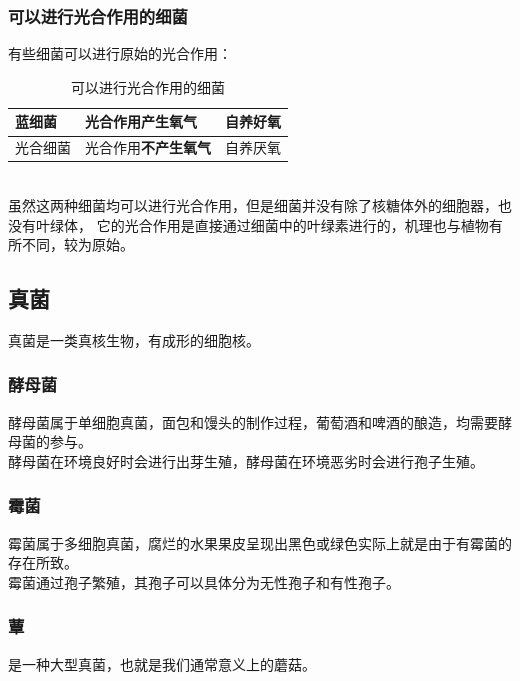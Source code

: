 \documentclass[UTF8]{ctexart}
\begin{document}
\subsubsection{可以进行光合作用的细菌}
    有些细菌可以进行原始的光合作用：\vspace{5pt}
    \begin{table}[h]
        \begin{center}
            \begin{tabular}{l|l|l}
                \hline
                蓝细菌\qquad\qquad&光合作用\textbf{产生氧气}\qquad\qquad&自养好氧\qquad\qquad\\ \hline
                光合细菌\qquad\qquad&光合作用\textbf{不产生氧气}\qquad\qquad&自养厌氧\qquad\qquad\\ \hline
            \end{tabular}
            \caption{可以进行光合作用的细菌}
        \end{center}
    \end{table}\\
    虽然这两种细菌均可以进行光合作用，但是细菌并没有除了核糖体外的细胞器，也没有叶绿体，
    它的光合作用是直接通过细菌中的叶绿素进行的，机理也与植物有所不同，较为原始。\\

\subsection{真菌}
    真菌是一类真核生物，有成形的细胞核。

\subsubsection{酵母菌}
    酵母菌属于单细胞真菌，面包和馒头的制作过程，葡萄酒和啤酒的酿造，均需要酵母菌的参与。\\[3mm]
    酵母菌在环境良好时会进行出芽生殖，酵母菌在环境恶劣时会进行孢子生殖。

\subsubsection{霉菌}
    霉菌属于多细胞真菌，腐烂的水果果皮呈现出黑色或绿色实际上就是由于有霉菌的存在所致。\\[3mm]
    霉菌通过孢子繁殖，其孢子可以具体分为无性孢子和有性孢子。

\subsubsection{蕈}
    是一种大型真菌，也就是我们通常意义上的蘑菇。\\[1mm]
\end{document}
